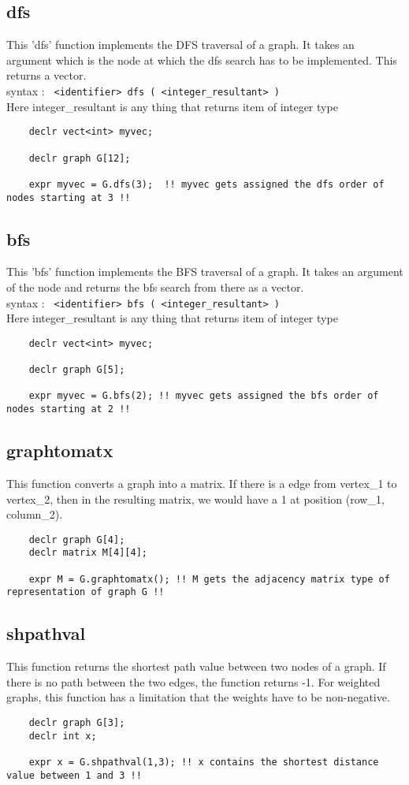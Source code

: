 \documentclass[journal, 18pt]{report}
\begin{document}
\subsection{dfs}
This 'dfs' function implements the DFS traversal of a graph. It takes an argument which is the node at which the dfs search has to be implemented. This returns a vector.\\
syntax : \texttt{ <identifier> dfs ( <integer\_resultant> ) }\\
Here integer\_resultant is any thing that returns item of integer type
\begin{lstlisting}
    declr vect<int> myvec;
    
    declr graph G[12];
    
    expr myvec = G.dfs(3);  !! myvec gets assigned the dfs order of nodes starting at 3 !!
\end{lstlisting}
\subsection{bfs}
This 'bfs' function implements the BFS traversal of a graph. It takes an argument of the node and returns the bfs search from there as a vector.\\
syntax : \texttt{ <identifier> bfs ( <integer\_resultant> ) }\\
Here integer\_resultant is any thing that returns item of integer type
\begin{lstlisting}
    declr vect<int> myvec;
    
    declr graph G[5];
    
    expr myvec = G.bfs(2); !! myvec gets assigned the bfs order of nodes starting at 2 !!
\end{lstlisting}
\subsection{graphtomatx}
This function converts a graph into a matrix. If there is a edge from vertex\_1 to vertex\_2, then in the resulting matrix, we would have a 1 at position (row\_1, column\_2).\\
\begin{lstlisting}
    declr graph G[4];
    declr matrix M[4][4];
    
    expr M = G.graphtomatx(); !! M gets the adjacency matrix type of representation of graph G !!
\end{lstlisting}
\subsection{shpathval}
This function returns the shortest path value between two nodes of a graph. If there is no path between the two edges, the function returns -1. For weighted graphs, this function has a limitation that the weights have to be non-negative.\\
\begin{lstlisting}
    declr graph G[3];
    declr int x;
    
    expr x = G.shpathval(1,3); !! x contains the shortest distance value between 1 and 3 !!
\end{lstlisting}
\end{document}
